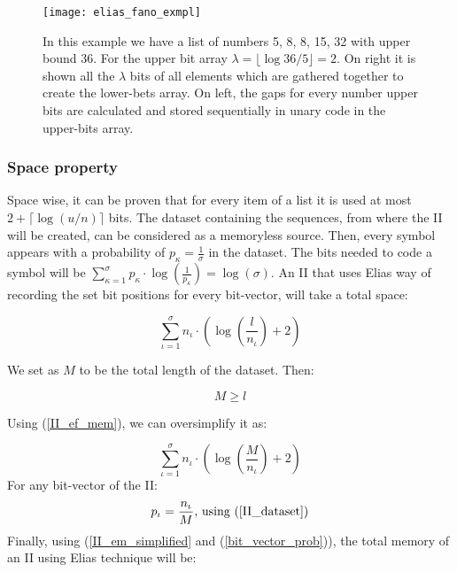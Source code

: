 \begin{figure}[h]
    \centering
    \texttt{[image: elias\_fano\_exmpl]}
    \caption{In this example we have a list of numbers 5, 8, 8, 15, 32 with upper bound 36. For the upper bit array \(\lambda = \lfloor \log36/5\rfloor = 2\). On right it is shown all the \(\lambda\) bits of all elements which are gathered together to create the lower-bets array. On left, the gaps for every number upper bits are calculated and stored sequentially in unary code in the upper-bits array.}
    \label{fig:ef_ex}
\end{figure}	
\subsubsection*{Space property}
\par Space wise, it can be proven \cite{vigna_quasi-succinct_2013} that for every item of a list it is used at most \(2 + \lceil\log(u/n)\rceil\) bits. The dataset containing the sequences, from where the II will be created, can be considered as a memoryless source. Then, every symbol appears with a probability of \(p_{\kappa} = \frac{1}{\sigma} \) in the dataset. The bits needed to code a symbol will be \( \sum_{\kappa = 1}^{\sigma} p_{\kappa} \cdot \log(\frac{1}{p_{\kappa}}) = \log(\sigma)\). An II that uses Elias way of recording the set bit positions for every bit-vector, will take a total space:

\begin{equation} \label{II_ef_mem}
\sum_{\iota = 1}^{\sigma} n_{\iota}\cdot ( \log(\frac{l}{n_{\iota}}) + 2 )
\end{equation}

We set as \(M\) to be the total length of the dataset. Then:

\begin{equation} \label{II_dataset}
	M \geq l 
\end{equation} 

Using (\ref{II_ef_mem}), we can oversimplify it as:

\begin{equation}\label{II_em_simplified}
	\sum_{\iota = 1}^{\sigma} n_{\iota}\cdot ( \log(\frac{M}{n_{\iota}}) + 2 )
\end{equation}
For any bit-vector of the II:
\begin{equation} \label{bit_vector_prob}
	p_{\iota} = \frac{n_{\iota}}{M} \textnormal{, using (\ref{II_dataset})}
\end{equation}
Finally, using (\ref{II_em_simplified} and (\ref{bit_vector_prob})), the total memory of an II using Elias technique will be:

